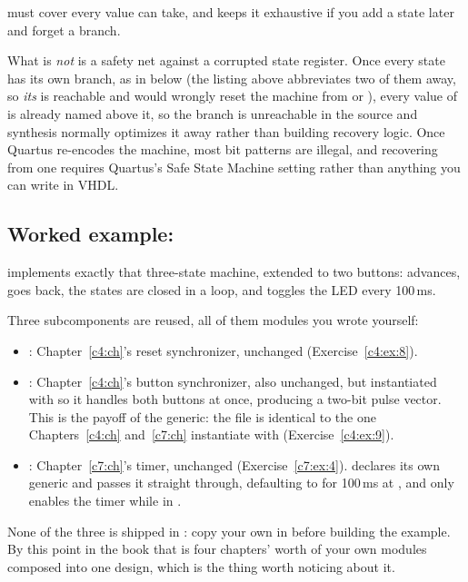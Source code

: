 \noindent{} must cover every value  can take, and
 keeps it exhaustive if you add a state later and forget a branch.

What  is \emph{not} is a safety net against a corrupted state register. Once
every state has its own branch, as in  below (the listing above abbreviates two
of them away, so \emph{its}  is reachable and would wrongly reset the machine from
 or ), every value of  is already named above it, so
the branch is unreachable in the source and synthesis normally optimizes it away rather than
building recovery logic. Once Quartus re-encodes the machine, most bit patterns are illegal, and
recovering from one requires Quartus's Safe State Machine setting rather than anything you can
write in VHDL.

\subsection{Worked example: }
\label{c8:fsmled}
 implements exactly that three-state machine, extended to two
buttons:  advances,  goes back, the states are closed in a loop,
and  toggles the LED every 100\,ms.

Three subcomponents are reused, all of them modules you wrote yourself:
\begin{itemize}
  \item {}: Chapter~\ref{c4:ch}'s reset synchronizer, unchanged
    (Exercise~\ref{c4:ex:8}).
  \item {}: Chapter~\ref{c4:ch}'s button synchronizer, also unchanged, but
    instantiated with  so it handles both buttons at once, producing a two-bit
    pulse vector. This is the payoff of the generic: the file is identical to the one
    Chapters~\ref{c4:ch} and~\ref{c7:ch} instantiate with  (Exercise~\ref{c4:ex:9}).
  \item {}: Chapter~\ref{c7:ch}'s timer, unchanged (Exercise~\ref{c7:ex:4}).
     declares its own  generic and passes it straight through,
    defaulting to  for 100\,ms at , and only enables the timer while in
    .
\end{itemize}
None of the three is shipped in : copy your own in before building the example. By
this point in the book that is four chapters' worth of your own modules composed into one design,
which is the thing worth noticing about it.

